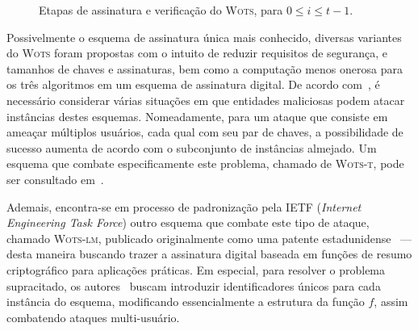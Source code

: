 \documentclass[12pt,notitlepage]{report}
\begin{document}
\begin{figure}[ht]
  \centering
  \caption{Etapas de assinatura e verificação do \textsc{Wots},
    para $0 \leq i \leq t - 1$.}
  \label{fig:5}
\end{figure}

Possivelmente o esquema de assinatura única mais conhecido, diversas variantes do
\textsc{Wots} foram propostas com o intuito de reduzir requisitos de segurança,
e tamanhos de chaves e assinaturas, bem como a computação menos onerosa para os
três algoritmos em um esquema de assinatura digital. De acordo
com~\cite{LafrancePhilip2017}, é necessário considerar várias situações em que
entidades maliciosas podem atacar instâncias destes esquemas. Nomeadamente, para
um ataque que consiste em ameaçar múltiplos usuários, cada qual com seu par de
chaves, a possibilidade de sucesso aumenta de acordo com o subconjunto de
instâncias almejado. Um esquema que combate especificamente este problema,
chamado de \textsc{Wots-t}, pode ser consultado em~\cite{Hulsing:2016:MMA:3081852.3081871}.

Ademais, encontra-se em processo de padronização pela IETF (\emph{Internet Engineering Task
Force}) outro esquema que combate este tipo de ataque, chamado \textsc{Wots-lm}, publicado
originalmente como uma patente estadunidense~\cite{lm-patent} --- desta maneira
buscando trazer a assinatura digital baseada em funções de resumo criptográfico
para aplicações práticas. Em especial, para resolver o problema supracitado, os
autores~\cite{mcgrew-hash-sigs-08} buscam introduzir identificadores únicos para cada instância do
esquema, modificando essencialmente a estrutura da função $f$, assim combatendo
ataques multi-usuário.
\end{document}
